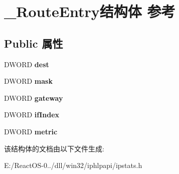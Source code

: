 \hypertarget{struct___route_entry}{}\section{\+\_\+\+Route\+Entry结构体 参考}
\label{struct___route_entry}
\subsection*{Public 属性}
\begin{DoxyCompactItemize}
\item 
\mbox{\label{struct___route_entry_afe7185082dc546e5f7381a88de3f05a1}} 
D\+W\+O\+RD {\bfseries dest}
\item 
\mbox{\label{struct___route_entry_acdc799dff6ed6cb4988bf5dca2f682c7}} 
D\+W\+O\+RD {\bfseries mask}
\item 
\mbox{\label{struct___route_entry_ae1ed8892d07011554677d14e7237d508}} 
D\+W\+O\+RD {\bfseries gateway}
\item 
\mbox{\label{struct___route_entry_a3819db685d1f619f79564119fb1169bb}} 
D\+W\+O\+RD {\bfseries if\+Index}
\item 
\mbox{\label{struct___route_entry_ac622423b7fef58002cf602a5e3f3cbf3}} 
D\+W\+O\+RD {\bfseries metric}
\end{DoxyCompactItemize}


该结构体的文档由以下文件生成\+:\begin{DoxyCompactItemize}
\item 
E\+:/\+React\+O\+S-\/0../dll/win32/iphlpapi/ipstats.\+h\end{DoxyCompactItemize}
